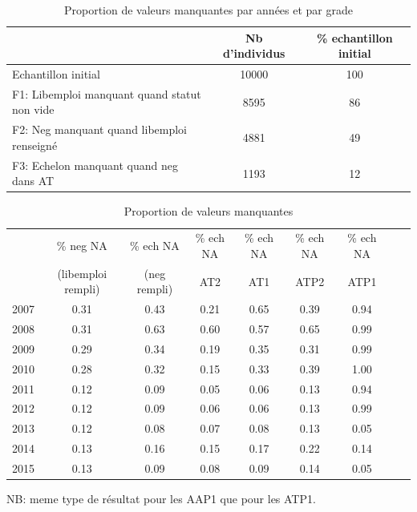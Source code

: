 \documentclass[11pt,a4paper]{article}
\begin{document}
\begin{table}[h!]
\centering
\caption{Proportion de valeurs manquantes par années et par grade} 
\label{filters}
\begin{tabular}{lcc}
\toprule
 & Nb d'individus & \% echantillon initial \\ 
  \hline
Echantillon initial & 10000 & 100 \\ 
F1: Libemploi manquant quand statut non vide & 8595 & 86 \\ 
F2: Neg manquant quand libemploi renseigné & 4881 & 49 \\ 
F3: Echelon manquant quand neg dans AT & 1193 & 12 \\ 
\bottomrule
\end{tabular}
\end{table}

\begin{table}[h!]
\centering
\caption{Proportion de valeurs manquantes} 
\label{filters}
\begin{tabular}{lcccccccc}
\toprule
& \% neg NA  & \% ech NA & \% ech NA   & \% ech NA   & \% ech NA  & \% ech NA  \\ 
& (libemploi rempli) & (neg rempli) & AT2 & AT1 & ATP2 & ATP1 \\
  \midrule 
2007 & 0.31 & 0.43 & 0.21 & 0.65 & 0.39 & 0.94 \\ 
  2008 & 0.31 & 0.63 & 0.60 & 0.57 & 0.65 & 0.99 \\ 
  2009 & 0.29 & 0.34 & 0.19 & 0.35 & 0.31 & 0.99 \\ 
  2010 & 0.28 & 0.32 & 0.15 & 0.33 & 0.39 & 1.00 \\ 
  2011 & 0.12 & 0.09 & 0.05 & 0.06 & 0.13 & 0.94 \\ 
  2012 & 0.12 & 0.09 & 0.06 & 0.06 & 0.13 & 0.99 \\ 
  2013 & 0.12 & 0.08 & 0.07 & 0.08 & 0.13 & 0.05 \\ 
  2014 & 0.13 & 0.16 & 0.15 & 0.17 & 0.22 & 0.14 \\ 
  2015 & 0.13 & 0.09 & 0.08 & 0.09 & 0.14 & 0.05 \\ 
\bottomrule
\end{tabular}
\end{table}

NB: meme type de résultat pour les AAP1 que pour les ATP1.
\end{document}

